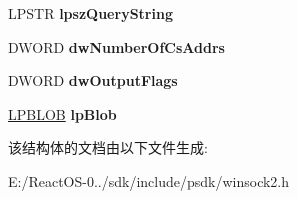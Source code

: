 \begin{DoxyCompactItemize}
L\+P\+S\+TR {\bfseries lpsz\+Query\+String}
\item 
\mbox{\label{struct___w_s_a_query_set_a_a10fb457dec7195b2c43b23339f8fc1d5}} 
D\+W\+O\+RD {\bfseries dw\+Number\+Of\+Cs\+Addrs}
\item 
\mbox{\label{struct___w_s_a_query_set_a_a581a771dcefd46e3404cf238e0aa8757}} 
D\+W\+O\+RD {\bfseries dw\+Output\+Flags}
\item 
\mbox{\label{struct___w_s_a_query_set_a_a70dca087b594ffde2a6f56c06bfd3f48}} 
\hyperlink{struct___b_l_o_b}{L\+P\+B\+L\+OB} {\bfseries lp\+Blob}
\end{DoxyCompactItemize}


该结构体的文档由以下文件生成\+:\begin{DoxyCompactItemize}
\item 
E\+:/\+React\+O\+S-\/0../sdk/include/psdk/winsock2.\+h\end{DoxyCompactItemize}
